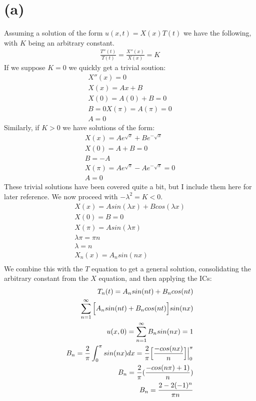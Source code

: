 \documentclass{article}
\begin{document}
\section*{\textbf{(a)}}
Assuming a solution of the form $u(x,t) = X(x)T(t)$ we have the following, with $K$ being an arbitrary constant.
\begin{equation}
\begin{aligned}
\frac{T''(t)}{T(t)} = \frac{X''(x)}{X(x)} = K
\end{aligned}
\end{equation}
If we suppose $K=0$ we quickly get a trivial soution:
\begin{equation}
\begin{aligned}
X''(x) = 0\\
X(x) = Ax + B\\
X(0) = A(0) + B=0\\
B=0
X(\pi) = A(\pi) = 0\\
A = 0
\end{aligned}
\end{equation}
Similarly, if $K>0$ we have solutions of the form:
\begin{equation}
\begin{aligned}
X(x) = Ae^{\sqrt{x}} + Be^{-\sqrt{x}}\\
X(0) = A + B = 0\\
B = -A\\
X(\pi) = Ae^{\sqrt{\pi}} -Ae^{-\sqrt{\pi}} = 0\\
A = 0
\end{aligned}
\end{equation}
These trivial solutions have been covered quite a bit, but I include them here for later reference. We now proceed with $-\lambda^2 = K < 0$.
\begin{equation}
\begin{aligned}
X(x) = Asin(\lambda x) + Bcos(\lambda x)\\
X(0) = B = 0\\
X(\pi) = Asin(\lambda \pi)\\
\lambda\pi = \pi n\\
\lambda = n\\
X_n(x) = A_nsin(nx)\\
\end{aligned}
\end{equation}
We combine this with the $T$ equation to get a general solution, consolidating the arbitrary constant from the $X$ equation, and then applying the ICs:
\begin{equation}
\begin{aligned}
T_n(t) = A_nsin(nt) + B_ncos(nt)\\
\sum^{\infty}_{n=1}\Big{[}A_nsin(nt) + B_ncos(nt)\Big{]}sin(nx)\\
u(x,0) = \sum^{\infty}_{n=1}B_nsin(nx) = 1\\
B_n = \frac{2}{\pi}\int_0^\pi sin(nx)dx = \frac{2}{\pi}\Big{[}\frac{-cos(nx)}{n}\Big{]}\Big{|}^\pi_0\\
 B_n = \frac{2}{\pi}(\frac{-cos(n\pi) + 1)}{n})\\
 B_n = \frac{2- 2(-1)^n}{\pi n}
\end{aligned}
\end{equation}
\end{document}
